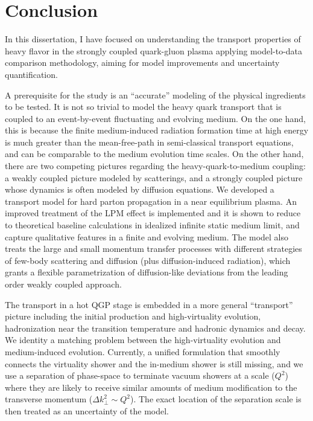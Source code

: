 \chapter{Conclusion}
\label{chapter:conclusion}
In this dissertation, I have focused on understanding the transport properties of heavy flavor in the strongly coupled quark-gluon plasma applying model-to-data comparison methodology, aiming for model improvements and uncertainty quantification.

A prerequisite for the study is an ``accurate'' modeling of the physical ingredients to be tested.
It is not so trivial to model the heavy quark transport that is coupled to an event-by-event fluctuating and evolving medium.
On the one hand, this is because the finite medium-induced radiation formation time at high energy is much greater than the mean-free-path in semi-classical transport equations, and can be comparable to the medium evolution time scales.
On the other hand, there are two competing pictures regarding the heavy-quark-to-medium coupling: a weakly coupled picture modeled by scatterings, and a strongly coupled picture whose dynamics is often modeled by diffusion equations.
We developed a transport model for hard parton propagation in a near equilibrium plasma. 
An improved treatment of the LPM effect is implemented and it is shown to reduce to theoretical baseline calculations in idealized infinite static medium limit, and capture qualitative features in a finite and evolving medium.
The model also treats the large and small momentum transfer processes with different strategies of few-body scattering and diffusion (plus diffusion-induced radiation), which grants a flexible parametrization of diffusion-like deviations from the leading order weakly coupled approach.

The transport in a hot QGP stage is embedded in a more general ``transport'' picture including the initial production and high-virtuality evolution, hadronization near the transition temperature and hadronic dynamics and decay.
We identity a matching problem between the high-virtuality evolution and medium-induced evolution.
Currently, a unified formulation that smoothly connects the virtuality shower and the in-medium shower is still missing, and we use a separation of phase-space to terminate vacuum showers at a scale ($Q^2$) where they are likely to receive similar amounts of medium modification to the transverse momentum ($\Delta k_\perp^2 \sim Q^2$).
The exact location of the separation scale is then treated as an uncertainty of the model.

